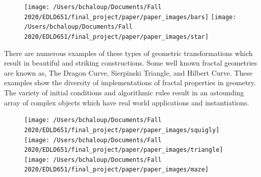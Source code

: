 \documentclass[english,jou]{apa6}
\begin{document}
\begin{figure}

{\centering \texttt{[image: /Users/bchaloup/Documents/Fall 2020/EDLD651/final\_project/paper/paper\_images/bars]} \texttt{[image: /Users/bchaloup/Documents/Fall 2020/EDLD651/final\_project/paper/paper\_images/star]} 

}

\caption{ }\label{fig:unnamed-chunk-2}
\end{figure}

There are numerous examples of these types of geometric transformations which result in beautiful and striking constructions. Some well known fractal geometries are known as, The Dragon Curve, Sierpinski Triangle, and Hilbert Curve. These examples show the diversity of implementations of fractal properties in geometry. The variety of initial conditions and algorithmic rules result in an astounding array of complex objects which have real world applications and instantiations.

\begin{figure}

{\centering \texttt{[image: /Users/bchaloup/Documents/Fall 2020/EDLD651/final\_project/paper/paper\_images/squigly]} \texttt{[image: /Users/bchaloup/Documents/Fall 2020/EDLD651/final\_project/paper/paper\_images/triangle]} \texttt{[image: /Users/bchaloup/Documents/Fall 2020/EDLD651/final\_project/paper/paper\_images/maze]} 

}

\caption{ }\label{fig:unnamed-chunk-3}
\end{figure}
\end{document}
